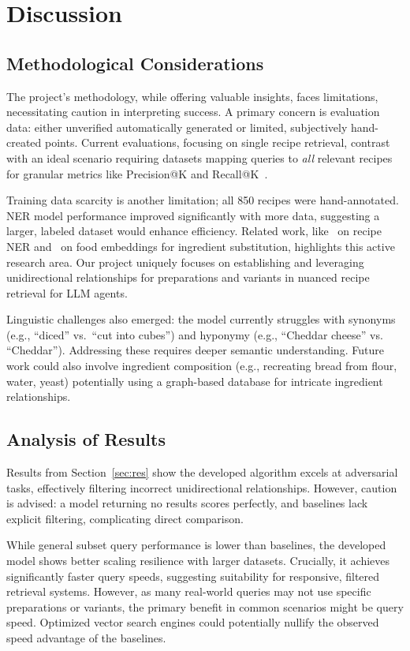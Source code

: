 \documentclass[11pt]{article}
\begin{document}
\section{Discussion}
\subsection{Methodological Considerations}
The project's methodology, while offering valuable insights, faces limitations,
necessitating caution in interpreting success. A primary concern is evaluation
data: either unverified automatically generated or limited, subjectively
hand-created points. Current evaluations, focusing on single recipe retrieval,
contrast with an ideal scenario requiring datasets mapping queries to \emph{all}
relevant recipes for granular metrics like Precision@K and
Recall@K~\cite{manning2009introduction}.

Training data scarcity is another limitation; all 850 recipes were hand-annotated.
NER model performance improved significantly with more data, suggesting a
larger, labeled dataset would enhance efficiency.  Related work,
like~\citet{deepLearninNERModelRecipes} on recipe NER and~\citet{ExploitFoodEmb}
on food embeddings for ingredient substitution, highlights this active research
area.
Our project uniquely focuses on establishing and leveraging unidirectional
relationships for preparations and variants in nuanced recipe retrieval for LLM
agents.

Linguistic challenges also emerged: the model currently struggles with synonyms
(e.g., ``diced'' vs.\ ``cut into cubes'') and hyponymy (e.g., ``Cheddar cheese''
vs. ``Cheddar'').
Addressing these requires deeper semantic understanding.
Future work could also involve ingredient composition (e.g., recreating bread
from flour, water, yeast) potentially using a graph-based database for intricate
ingredient relationships.

\subsection{Analysis of Results}
Results from Section~\ref{sec:res} show the developed algorithm excels at
adversarial tasks, effectively filtering incorrect unidirectional
relationships.
However, caution is advised: a model returning no results scores perfectly, and
baselines lack explicit filtering, complicating direct comparison.

While general subset query performance is lower than baselines, the developed
model shows better scaling resilience with larger datasets.
Crucially, it achieves significantly faster query speeds, suggesting suitability
for responsive, filtered retrieval systems.
However, as many real-world queries may not use specific preparations or
variants, the primary benefit in common scenarios might be query speed.
Optimized vector search engines could potentially nullify the observed speed
advantage of the baselines.
\end{document}
